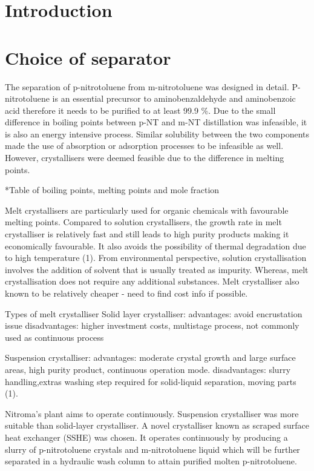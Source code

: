 \section{Introduction}


\section{Choice of separator}
The separation of p-nitrotoluene from m-nitrotoluene was designed in detail. P-nitrotoluene is an essential precursor to aminobenzaldehyde and aminobenzoic acid therefore it needs to be purified to at least 99.9 \%. Due to the small difference in boiling points between p-NT and m-NT distillation was infeasible, it is also an energy intensive process. Similar solubility between the two components made the use of absorption or adsorption processes to be infeasible as well. However, crystallisers were deemed feasible due to the difference in melting points. 

*Table of boiling points, melting points and mole fraction 

Melt crystallisers are particularly used for organic chemicals with favourable melting points. Compared to solution crystallisers, the growth rate in melt crystalliser is relatively fast and still leads to high purity products making it economically favourable. It also avoids the possibility  of thermal degradation  due to high temperature (1). From environmental perspective, solution crystallisation involves the addition of solvent that is usually treated as impurity. Whereas, melt crystallisation does not require any additional substances. Melt crystalliser also known to be relatively cheaper - need to find cost info if possible.

Types of melt crystalliser
Solid layer crystalliser:
advantages: avoid encrustation issue
disadvantages: higher investment costs, multistage process, not commonly used as continuous process

Suspension crystalliser:
advantages: moderate crystal growth and large surface areas, high purity product, continuous operation mode.
disadvantages: slurry handling,extras washing step required for solid-liquid separation, moving parts (1). 

Nitroma’s plant aims to operate continuously. Suspension crystalliser was more suitable than solid-layer crystalliser. A novel crystalliser known as scraped surface heat exchanger (SSHE) was chosen. It operates continuously by producing a slurry of p-nitrotoluene crystals and m-nitrotoluene liquid which will be further separated in a hydraulic wash column to attain purified molten p-nitrotoluene. 

